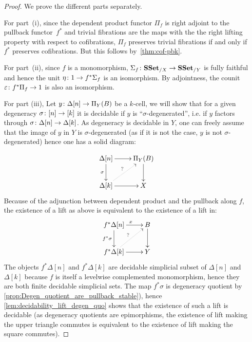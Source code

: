 \documentclass[reqno,10pt,a4paper,oneside,draft]{amsart}
\begin{document}
 
\begin{proof} We prove the different parts separately. 

For part~(i), since the dependent product functor $\Pi_f$ is right adjoint to the pullback functor~$f^*$ and trivial fibrations are the maps with the the right lifting property with respect to cofibrations, $\Pi_f$ preserves trivial fibrations if and only if $f^*$ preserves cofibrations. But this follows by~\cref{thm:cof-pbk}.

For part~(ii),  since $f$ is a monomorphism,  $\Sigma_f \colon \mathbf{SSet}_{/X} \rightarrow \mathbf{SSet}_{/Y}$ is fully faithful and hence the unit $\eta \colon 1 \rightarrow f^*  \Sigma_{f}$ is an isomorphism. By adjointness, the counit $\varepsilon \colon f^* \Pi_f \rightarrow 1$ is also an isomorphism. 

For part (iii), Let $y \colon  \Delta[n] \rightarrow \Pi_Y(B)$ be a  $k$-cell, we will show that for a given degeneracy $\sigma \colon [n] \rightarrow [k]$ it is decidable if $y$ is ``$\sigma$-degenerated'', i.e. if $y$ factors through $\sigma \colon \Delta[n] \rightarrow \Delta[k]$. As degeneracy is decidable in $Y$, one can freely assume that the image of $y$ in $Y$ is $\sigma$-degenerated (as if it is not the case, $y$ is not $\sigma$-degenerated) hence one has a solid diagram:

\[
\xymatrix{
\Delta[n] \ar[d]_{\sigma} \ar[r] & \Pi_Y(B) \ar[d] \\
\Delta[k] \ar@{.>}[ur]^? \ar[r] & X  \\
}
\]
Because of the adjunction between dependent product and the pullback along $f$, the existence of a lift as above is equivalent to the existence of a lift in:
\[
\xymatrix{
f^* \Delta[n] \ar[d]_{f^* \sigma} \ar[r]^x & B \ar[d] \\
f^* \Delta[k] \ar@{.>}[ur]^? \ar[r] & Y  \\
}
\]
The objects $f^* \Delta[n]$ and $f^* \Delta[k]$ are decidable simplicial subset of $\Delta[n]$ and $\Delta[k]$ because $f$ is itself a levelwise complemented monomorphism, hence they are both finite decidable simplicial sets. The map $f^* \sigma$ is degeneracy quotient by \cref{prop:Degen_quotient_are_pullback_stable}), hence \cref{lem:decidability_lift_degen_quo} shows that the existence of such a lift is decidable (as degeneracy quotients are epimorphisms, the existence of lift making the upper triangle commutes is equivalent to the existence of lift making the square commutes).




\end{proof}
\end{document}
